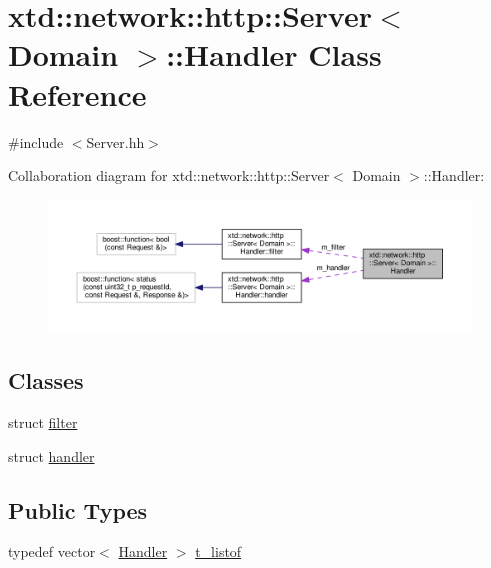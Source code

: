\hypertarget{classxtd_1_1network_1_1http_1_1Server_1_1Handler}{}\section{xtd\+:\+:network\+:\+:http\+:\+:Server$<$ Domain $>$\+:\+:Handler Class Reference}
\label{classxtd_1_1network_1_1http_1_1Server_1_1Handler}


{\ttfamily \#include $<$Server.\+hh$>$}



Collaboration diagram for xtd\+:\+:network\+:\+:http\+:\+:Server$<$ Domain $>$\+:\+:Handler\+:
\nopagebreak
\begin{figure}[H]
\begin{center}
\leavevmode
\includegraphics[width=350pt]{classxtd_1_1network_1_1http_1_1Server_1_1Handler__coll__graph}
\end{center}
\end{figure}
\subsection*{Classes}
\begin{DoxyCompactItemize}
\item 
struct \hyperlink{structxtd_1_1network_1_1http_1_1Server_1_1Handler_1_1filter}{filter}
\item 
struct \hyperlink{structxtd_1_1network_1_1http_1_1Server_1_1Handler_1_1handler}{handler}
\end{DoxyCompactItemize}
\subsection*{Public Types}
\begin{DoxyCompactItemize}
\item 
typedef vector$<$ \hyperlink{classxtd_1_1network_1_1http_1_1Server_1_1Handler}{Handler} $>$ \hyperlink{classxtd_1_1network_1_1http_1_1Server_1_1Handler_a840883d08fcdd990dbe33b660ee6febb}{t\+\_\+listof}
\end{DoxyCompactItemize}
